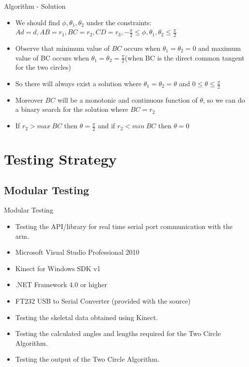 \documentclass{beamer}
\begin{document}
\begin{frame}{Algorithm - Solution}
  \begin{itemize}
  \item We should find $\phi,\theta_1,\theta_2$ under the constraints: $Ad=d,AB=r_1,BC=r_2,CD=r_3,-\frac{\pi}{2}\le\phi,\theta_1,\theta_2\le\frac{\pi}{2}$
  \item Observe that minimum value of $BC$ occurs when $\theta_1=\theta_2=0$ and maximum value of BC occurs when $\theta_1=\theta_2=\frac{\pi}{2}$(when BC is the direct common tangent for the two circles)
  \item So there will always exist a solution where $\theta_1=\theta_2=\theta$ and $0\le\theta\le\frac{\pi}{2}$
  \item Moreover $BC$ will be a monotonic and continuous function of $\theta$, so we can do a binary search for the solution where $BC=r_2$
  \item If $r_2>max\ BC$ then $\theta=\frac{\pi}{2}$ and if $r_2<min\ BC$ then $\theta=0$
  \end{itemize}
\end{frame}

\section{Testing Strategy}

\subsection{Modular Testing}
\begin{frame}{Modular Testing}
\begin{itemize}
\item Testing the API/library for real time serial port communication with the arm.\item Microsoft Visual Studio Professional 2010
\item Kinect for Windows SDK v1
\item .NET Framework 4.0 or higher
\item FT232 USB to Serial Converter (provided with the source)

\item Testing the skeletal data obtained using Kinect.
\item Testing the calculated angles and lengths required for the Two Circle Algorithm.
\item Testing the output of the Two Circle Algorithm.
\end{itemize}
\end{frame}
\end{document}
